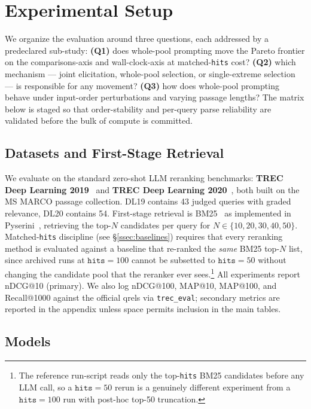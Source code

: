 \section{Experimental Setup}
\label{sec:experimental_setup}

We organize the evaluation around three questions, each addressed by a
predeclared sub-study: \textbf{(Q1)} does whole-pool prompting move the
Pareto frontier on the comparisons-axis and wall-clock-axis at
matched-\texttt{hits} cost? \textbf{(Q2)} which mechanism --- joint
elicitation, whole-pool selection, or single-extreme selection --- is
responsible for any movement? \textbf{(Q3)} how does whole-pool prompting
behave under input-order perturbations and varying passage lengths? The
matrix below is staged so that order-stability and per-query parse
reliability are validated before the bulk of compute is committed.

\subsection{Datasets and First-Stage Retrieval}

We evaluate on the standard zero-shot LLM reranking benchmarks: \textbf{TREC
Deep Learning 2019}~\citep{craswell2020dl19} and \textbf{TREC Deep Learning
2020}~\citep{craswell2021dl20}, both built on the MS MARCO passage
collection. DL19 contains 43 judged queries with graded relevance, DL20
contains 54. First-stage retrieval is BM25~\citep{robertson2009bm25} as
implemented in Pyserini~\citep{lin2021pyserini}, retrieving the top-$N$
candidates per query for $N \in \{10,20,30,40,50\}$. Matched-\texttt{hits}
discipline (see \S\ref{ssec:baselines}) requires that every reranking method
is evaluated against a baseline that re-ranked the \emph{same} BM25 top-$N$
list, since archived runs at $\texttt{hits}{=}100$ cannot be subsetted to
$\texttt{hits}{=}50$ without changing the candidate pool that the reranker
ever sees.\footnote{The reference run-script reads only the top-\texttt{hits}
BM25 candidates before any LLM call, so a $\texttt{hits}{=}50$ rerun is a
genuinely different experiment from a $\texttt{hits}{=}100$ run with
post-hoc top-50 truncation.} All experiments report nDCG@10 (primary). We
also log nDCG@100, MAP@10, MAP@100, and Recall@1000 against the official
qrels via \texttt{trec\_eval}; secondary metrics are reported in the
appendix unless space permits inclusion in the main tables.

\subsection{Models}


